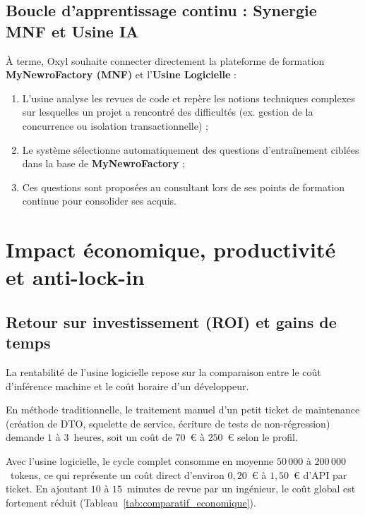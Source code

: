 \documentclass{tnreport}
\begin{document}
\subsection{Boucle d'apprentissage continu : Synergie MNF et Usine IA}
\label{subsec:synergie_directe_mnf_usine}

À terme, Oxyl souhaite connecter directement la plateforme de formation \textbf{MyNewroFactory (MNF)} et l'\textbf{Usine Logicielle} :
\begin{enumerate}
    \item L'usine analyse les revues de code et repère les notions techniques complexes sur lesquelles un projet a rencontré des difficultés (ex. gestion de la concurrence ou isolation transactionnelle) ;
    \item Le système sélectionne automatiquement des questions d'entraînement ciblées dans la base de \textbf{MyNewroFactory} ;
    \item Ces questions sont proposées au consultant lors de ses points de formation continue pour consolider ses acquis.
\end{enumerate}

\section{Impact économique, productivité et anti-lock-in}
\label{sec:impact_eco}

\subsection{Retour sur investissement (ROI) et gains de temps}
\label{subsec:roi_productivite}

La rentabilité de l'usine logicielle repose sur la comparaison entre le coût d'inférence machine et le coût horaire d'un développeur.

En méthode traditionnelle, le traitement manuel d'un petit ticket de maintenance (création de DTO, squelette de service, écriture de tests de non-régression) demande $1$ à $3$~heures, soit un coût de $70$~€ à $250$~€ selon le profil.

Avec l'usine logicielle, le cycle complet consomme en moyenne $50\,000$ à $200\,000$~tokens, ce qui représente un coût direct d'environ $0{,}20$~€ à $1{,}50$~€ d'API par ticket. En ajoutant $10$ à $15$~minutes de revue par un ingénieur, le coût global est fortement réduit (Tableau~\ref{tab:comparatif_economique}).
\end{document}
